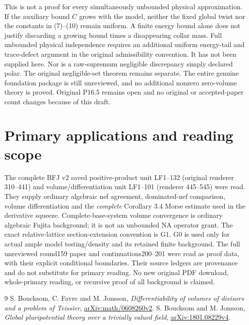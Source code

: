 \documentclass[11pt]{article}
\begin{document}
This is not a proof for every simultaneously unbounded physical
approximation. If the auxiliary bound $C$ grows with the model,
neither the fixed global twist nor the constants in (7)--(10)
remain uniform. A finite energy bound alone does not justify
discarding a growing bound times a disappearing collar mass.
Full unbounded physical independence requires an additional
uniform energy-tail and trace-defect argument in the original
admissibility convention. It has not been supplied here.
Nor is a raw-supremum negligible discrepancy simply declared
polar. The original negligible-set theorem remains separate.
The entire genuine foundation package is still unreviewed,
and no additional nonzero zero-volume theory is proved.
Original P16.5 remains open and no original or accepted-paper
count changes because of this draft.

\section{Primary applications and reading scope}
The complete BFJ v2 saved positive-product unit LF1--132
(original renderer 310--441) and volume/differentiation unit
LF1--101 (renderer 445--545) were read.
They supply ordinary algebraic nef agreement, dominated-nef
comparison, volume differentiation and the \emph{complete}
Corollary 3.4 Morse estimate used in the derivative squeeze.
Complete-base-system volume convergence is ordinary algebraic
Fujita background; it is not an unbounded NA operator grant.
The exact relative-lattice section-extension convention is G1.
G0 is used only for actual ample model testing/density and its
retained finite background.
The full unreviewed round159 paper and continuations200--201
were read as proof data, with their explicit conditional boundaries.
Their source ledgers are provenance and do not substitute for
primary reading. No new original PDF download, whole-primary
reading, or recursive proof of all background is claimed.

\begin{thebibliography}{9}
 S. Boucksom, C. Favre and M. Jonsson,
\emph{Differentiability of volumes of divisors and a problem of Teissier},
\href{https://arxiv.org/html/math/0608260v2}{arXiv:math/0608260v2}.
 S. Boucksom and M. Jonsson,
\emph{Global pluripotential theory over a trivially valued field},
\href{https://arxiv.org/pdf/1801.08229v4}{arXiv:1801.08229v4}.
\end{thebibliography}
\end{document}
